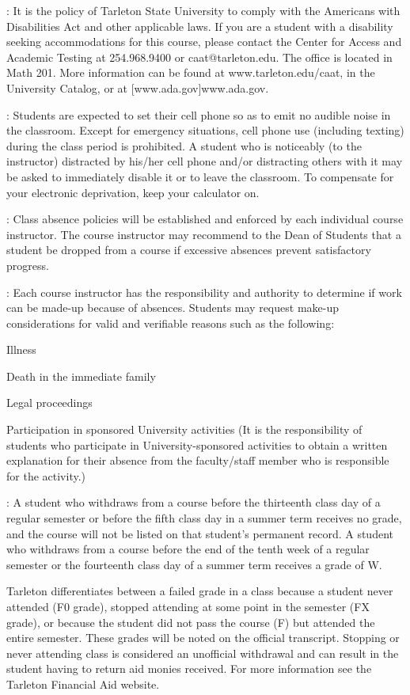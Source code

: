 \documentclass[letterpaper]{article}
\begin{document}
:  It is the policy of Tarleton State University to comply with the Americans with Disabilities Act and other applicable laws. If you are a student with a disability seeking accommodations for this course, please contact the Center for Access and Academic Testing at 254.968.9400 or caat@tarleton.edu. The office is located in Math 201. More information can be found at www.tarleton.edu/caat, in the University Catalog, or at [www.ada.gov]www.ada.gov.

: Students are expected to set their cell phone so as to emit no audible noise in the classroom. Except for emergency situations, cell phone use (including texting) during the class period is prohibited. A student who is noticeably (to the instructor) distracted by his/her cell phone and/or distracting others with it may be asked to immediately disable it or to leave the classroom.  To compensate for your electronic deprivation, keep your calculator on.

:  Class absence policies will be established and enforced by each individual course instructor.  The course instructor may recommend to the Dean of Students that a student be dropped from a course if excessive absences prevent satisfactory progress.

:  Each course instructor has the responsibility and authority to determine if work can be made-up because of absences.  Students may request make-up considerations for valid and verifiable reasons such as the following:
\bit
\item Illness
\item Death in the immediate family
\item Legal proceedings
\item Participation in sponsored University activities (It is the responsibility of students who participate in University-sponsored activities to obtain a written explanation for their absence from the faculty/staff member who is responsible for the activity.)
\eit

:  A student who withdraws from a course before the thirteenth class day of a regular semester or before the fifth class day in a summer term receives no grade, and the course will not be listed on that student's permanent record.  A student who withdraws from a course before the end of the tenth week of a regular semester or the fourteenth class day of a summer term receives a grade of W.

Tarleton differentiates between a failed grade in a class because a student never attended (F0 grade), stopped attending at some point in the semester (FX grade), or because the student did not pass the course (F) but attended the entire semester. These grades will be noted on the official transcript. Stopping or never attending class is considered an unofficial withdrawal and can result in the student having to return aid monies received.  For more information see the Tarleton Financial Aid website.
\end{document}
